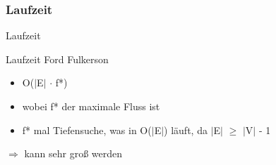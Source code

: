 \subsubsection{Laufzeit}
\begin{frame}{Laufzeit}
  \begin{block}{Laufzeit Ford Fulkerson}
      \begin{itemize}
        \item O($\mid$E$\mid$ $\cdot$ f*)
        \pause
        \item wobei f* der maximale Fluss ist
        \pause
        \item f* mal Tiefensuche, was in O($\mid$E$\mid$) läuft, da $\mid$E$\mid$ $\geq$ $\mid$V$\mid$ - 1
      \end{itemize}
      \pause
      $\Rightarrow$ kann sehr groß werden
  \end{block}
\end{frame}
